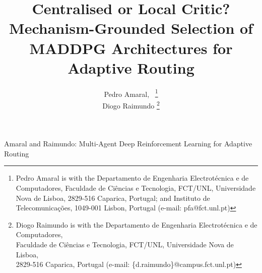 \documentclass[10pt,journal,comsoc]{IEEEtran}
\begin{document}
\title{Centralised or Local Critic? Mechanism-Grounded Selection of MADDPG Architectures for Adaptive Routing}

\author{
  Pedro Amaral,~%
  \thanks{Pedro Amaral is with the Departamento de Engenharia Electrot\'ecnica e de Computadores, Faculdade de Ci\^encias e Tecnologia,
  FCT/UNL, Universidade Nova de Lisboa, 2829-516 Caparica, Portugal; and Instituto de Telecomunica\c{c}\~oes, 1049-001 Lisbon, Portugal (e-mail: pfa@fct.unl.pt)}%
  \\
  Diogo Raimundo%
  \thanks{Diogo Raimundo is with the Departamento de Engenharia Electrot\'ecnica e de Computadores,\\ Faculdade de Ci\^encias e Tecnologia, FCT/UNL, Universidade Nova de Lisboa,\\ 2829-516 Caparica, Portugal (e-mail: \{d.raimundo\}@campus.fct.unl.pt)}
}

%
{Amaral and Raimundo: Multi-Agent Deep Reinforcement Learning for Adaptive Routing}

\maketitle
\end{document}

